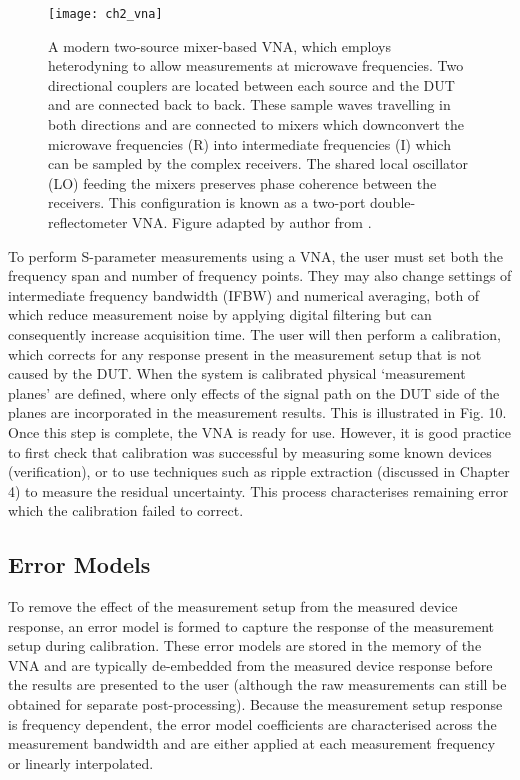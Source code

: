 \documentclass[../thesis.tex]{subfiles}
\begin{document}
\begin{refsection}
\begin{figure}
	\centering
	\texttt{[image: ch2\_vna]}
	\caption{A modern two-source mixer-based VNA, which employs heterodyning to allow measurements at microwave frequencies. Two directional couplers are located between each source and the DUT and are connected back to back. These sample waves travelling in both directions and are connected to mixers which downconvert the microwave frequencies (R) into intermediate frequencies (I) which can be sampled by the complex receivers. The shared local oscillator (LO) feeding the mixers preserves phase coherence between the receivers. This configuration is known as a two-port double-reflectometer VNA. Figure adapted by author from \cite{Root2013}.}
	\label{ch2_vna}
\end{figure}

To perform S-parameter measurements using a VNA, the user must set both the frequency span and number of frequency points. They may also change settings of intermediate frequency bandwidth (IFBW) and numerical averaging, both of which reduce measurement noise by applying digital filtering but can consequently increase acquisition time. The user will then perform a calibration, which corrects for any response present in the measurement setup that is not caused by the DUT. When the system is calibrated physical ‘measurement planes’ are defined, where only effects of the signal path on the DUT side of the planes are incorporated in the measurement results. This is illustrated in Fig. 10. Once this step is complete, the VNA is ready for use. However, it is good practice to first check that calibration was successful by measuring some known devices (verification), or to use techniques such as ripple extraction (discussed in Chapter 4) to measure the residual uncertainty. This process characterises remaining error which the calibration failed to correct.

\subsection{Error Models}

To remove the effect of the measurement setup from the measured device response, an error model is formed to capture the response of the measurement setup during calibration. These error models are stored in the memory of the VNA and are typically de-embedded from the measured device response before the results are presented to the user (although the raw measurements can still be obtained for separate post-processing). Because the measurement setup response is frequency dependent, the error model coefficients are characterised across the measurement bandwidth and are either applied at each measurement frequency or linearly interpolated.


\end{refsection}
\end{document}
